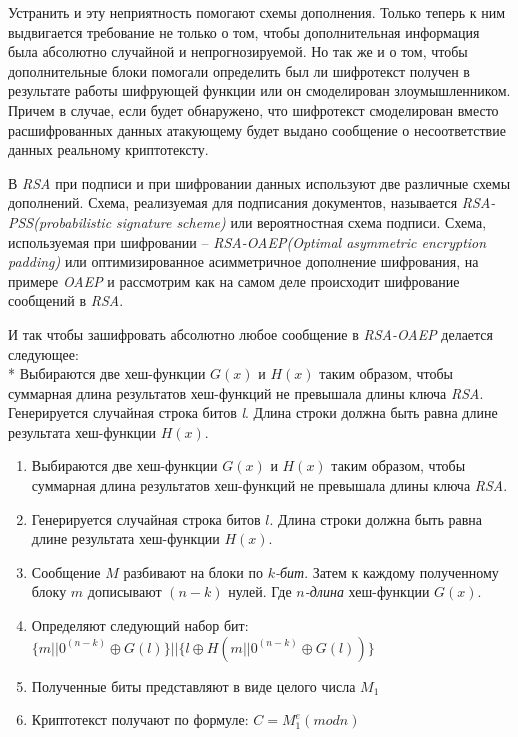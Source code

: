   Устранить и эту неприятность помогают схемы дополнения. Только теперь к ним выдвигается требование не только о том, чтобы дополнительная информация была 
  абсолютно случайной и непрогнозируемой. Но так же и о том, чтобы дополнительные блоки помогали определить был ли шифротекст получен в результате работы 
  шифрующей функции или он смоделирован злоумышленником. Причем в случае, если будет обнаружено, что шифротекст смоделирован вместо расшифрованных данных 
  атакующему будет выдано сообщение о несоответствие данных реальному криптотексту.

  В \textit{RSA} при подписи и при шифровании данных используют две различные схемы дополнений. Схема, реализуемая для подписания документов, называется 
  \textit{RSA-PSS(probabilistic signature scheme)} или вероятностная схема подписи. Схема, используемая при шифровании – 
  \textit{RSA-OAEP(Optimal asymmetric encryption padding)} или оптимизированное асимметричное дополнение шифрования, на примере \textit{OAEP} и рассмотрим 
  как на самом деле происходит шифрование сообщений в \textit{RSA}.

  И так чтобы зашифровать абсолютно любое сообщение в \textit{RSA-OAEP} делается следующее: \\*
  Выбираются две хеш-функции {$G(x)$} и {$H(x)$} таким образом, чтобы суммарная длина результатов хеш-функций не превышала длины ключа \textit{RSA}. Генерируется случайная строка битов \textit{l}. Длина строки должна быть равна длине результата хеш-функции {$H(x)$}.

    \begin{enumerate}
	    \item Выбираются две хеш-функции {$G(x)$} и {$H(x)$} таким образом, чтобы суммарная длина результатов хеш-функций не превышала длины 
	      ключа \textit{RSA}.
	    \item Генерируется случайная строка битов {$l$}. Длина строки должна быть равна длине результата хеш-функции {$H(x)$}.
	    \item Сообщение {$M$} разбивают на блоки по \textit{{$k$}-бит}. Затем к каждому полученному блоку {$m$} дописывают {$(n-k)$} нулей. 
	      Где \textit{{$n$}-длина} хеш-функции {$G(x)$}.
	    \item Определяют следующий набор бит: {$ \{m||0^{(n-k)} \oplus G(l)\}||\{l \oplus H(m||0^{(n-k)} \oplus G(l))\} $}
	    \item Полученные биты представляют в виде целого числа {$M_1$}
	    \item Криптотекст получают по формуле: {$ C=M_{1}^{e}(mod n) $}
    \end{enumerate}

